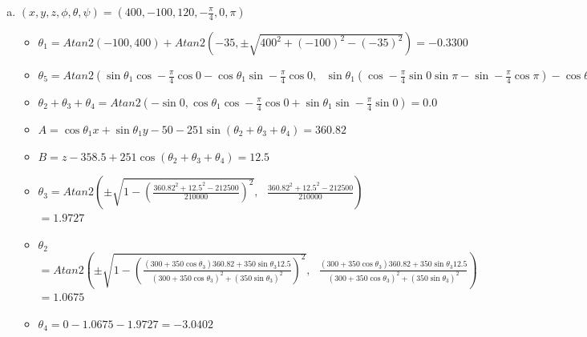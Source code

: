 \documentclass[12pt, a4paper]{article}
\begin{document}
\begin{enumerate}[(1)]
\begin{enumerate}[(a)]
\item
$(x, y, z, \phi, \theta, \psi) = (400, -100, 120, -\frac{\pi}{4}, 0, \pi)$ 
\begin{itemize}
\item
$\theta_1 = Atan2(-100, 400) + Atan2(-35, \pm \sqrt{400^2 + (-100)^2 - (-35)^2}) = -0.3300$ 
\item
$\theta_5 = Atan2(\sin \theta_1 \cos -\frac{\pi}{4} \cos 0 - \cos \theta_1 \sin -\frac{\pi}{4} \cos 0, \mbox{ } \sin \theta_1(\cos-\frac{\pi}{4} \sin 0 \sin\pi - \sin-\frac{\pi}{4} \cos\pi) - \cos\theta_1(\sin-\frac{\pi}{4} \sin0 \sin\pi + \cos-\frac{\pi}{4} \cos\pi)) = 0.4554$
\item
$\theta_2 + \theta_3 + \theta_4 = Atan2(-\sin 0, \cos\theta_1 \cos-\frac{\pi}{4} \cos0 + \sin\theta_1 \sin-\frac{\pi}{4} \sin0) = 0.0$
\item
$A = \cos\theta_1 x + \sin\theta_1 y - 50 - 251\sin(\theta_2 + \theta_3 + \theta_4) = 360.82$
\item
$B = z - 358.5 + 251\cos(\theta_2 + \theta_3 + \theta_4) = 12.5$
\item
$\theta_3 = Atan2(\pm \sqrt{1 - (\frac{360.82^2 + 12.5^2 - 212500}{210000})^2}, \mbox{ } \frac{360.82^2 + 12.5^2 - 212500}{210000})$ \\ $=1.9727$
\item
$\theta_2$ \\ $= Atan2(\pm \sqrt{1 - (\frac{(300 + 350\cos\theta_3)360.82 + 350\sin\theta_3 12.5}{(300 + 350\cos\theta_3)^2 + (350\sin\theta_3)^2})^2}, \mbox{ } \frac{(300 + 350\cos\theta_3)360.82 + 350\sin\theta_3 12.5}{(300 + 350\cos\theta_3)^2 + (350\sin\theta_3)^2})$ \\ $=1.0675$
\item
$\theta_4 = 0 - 1.0675 - 1.9727 = -3.0402$
\end{itemize}

\end{enumerate}

\end{enumerate}
\end{document}

